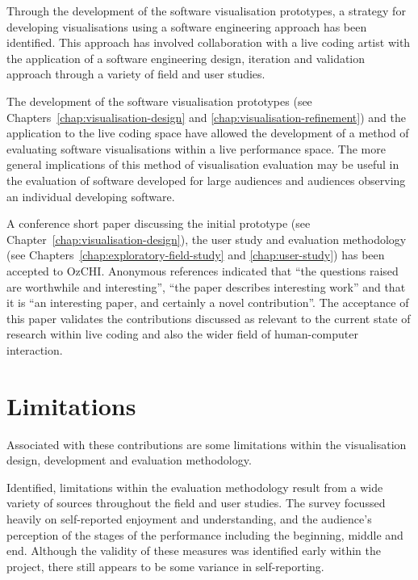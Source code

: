 
Through the development of the software visualisation prototypes, a strategy for developing visualisations using a software engineering approach has been identified. This approach has involved collaboration with a live coding artist with the application of a software engineering design, iteration and validation approach through a variety of field and user studies.

The development of the software visualisation prototypes (see Chapters~\ref{chap:visualisation-design} and \ref{chap:visualisation-refinement}) and the application to the live coding space have allowed the development of a method of evaluating software visualisations within a live performance space. The more general implications of this method of visualisation evaluation may be useful in the evaluation of software developed for large audiences and audiences observing an individual developing software.

A conference short paper discussing the initial prototype (see Chapter~\ref{chap:visualisation-design}), the user study and evaluation methodology (see Chapters~\ref{chap:exploratory-field-study} and \ref{chap:user-study}) has been accepted to OzCHI. Anonymous references indicated that ``the questions raised are worthwhile and interesting'', ``the paper describes interesting work'' and that it is ``an interesting paper, and certainly a novel contribution''. The acceptance of this paper validates the contributions discussed as relevant to the current state of research within live coding and also the wider field of human-computer interaction.

\section{Limitations}

Associated with these contributions are some limitations within the visualisation design, development and evaluation methodology.

Identified, limitations within the evaluation methodology result from a wide variety of sources throughout the field and user studies. The survey focussed heavily on self-reported enjoyment and understanding, and the audience's perception of the stages of the performance including the beginning, middle and end. Although the validity of these measures was identified early within the project, there still appears to be some variance in self-reporting.

